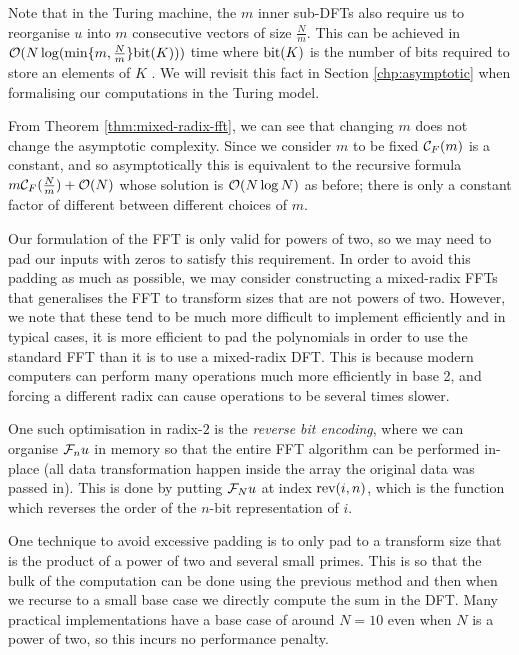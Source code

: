 Note that in the Turing machine, the $m$ inner sub-DFTs also require us to reorganise $u$ into $m$ consecutive vectors of size $\frac{N}{m}$. This can be achieved in $\mathcal O(N \log( \min \{m, \frac{N}{m}\}\textrm{bit}(K)))$ time where $\textrm{bit}(K)$ is the number of bits required to store an elements of $K$ \cite{ffnlogn}. We will revisit this fact in Section \ref{chp:asymptotic} when formalising our computations in the Turing model.

From Theorem \ref{thm:mixed-radix-fft}, we can see that changing $m$ does not change the asymptotic complexity. Since we consider $m$ to be fixed $\mathcal C_F(m)$ is a constant, and so asymptotically this is equivalent to the recursive formula $m\mathcal C_F(\frac{N}{m}) + \mathcal O(N)$ whose solution is $\mathcal O(N \log N)$ as before; there is only a constant factor of different between different choices of $m$.

\begin{remark}

    Our formulation of the FFT is only valid for powers of two, so we may need to pad our inputs with zeros to satisfy this requirement. In order to avoid this padding as much as possible, we may consider constructing a mixed-radix FFTs that generalises the FFT to transform sizes that are not powers of two. However, we note that these tend to be much more difficult to implement efficiently and in typical cases, it is more efficient to pad the polynomials in order to use the standard FFT than it is to use a mixed-radix DFT. This is because modern computers can perform many operations much more efficiently in base 2, and forcing a different radix can cause operations to be several times slower.

    One such optimisation in radix-$2$ is the \emph{reverse bit encoding}, where we can organise $\mathcal F_n u$ in memory so that the entire FFT algorithm can be performed in-place (all data transformation happen inside the array the original data was passed in). This is done by putting $\mathcal F_N u$ at index $\textrm{rev}(i, n)$, which is the function which reverses the order of the $n$-bit representation of $i$.

    One technique to avoid excessive padding is to only pad to a transform size that is the product of a power of two and several small primes.
    This is so that the bulk of the computation can be done using the previous method and then when we recurse to a small base case we directly compute the sum in the DFT. Many practical implementations have a base case of around $N = 10$ even when $N$ is a power of two, so this incurs no performance penalty.

\end{remark}


